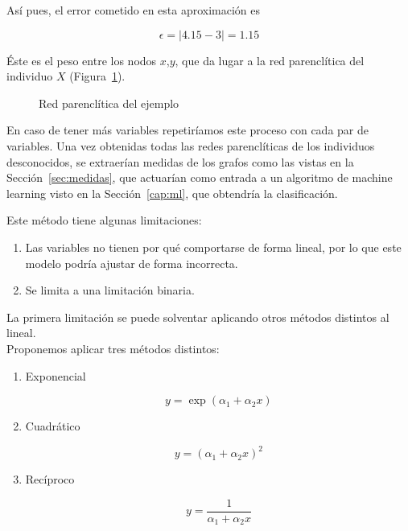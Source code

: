 \begin{ejemplo}
	Así pues, el error cometido en esta aproximación es
	
	\begin{equation*}
	\epsilon = |4.15 - 3| = 1.15
	\end{equation*}
	
	Éste es el peso entre los nodos $x$,$y$, que da lugar a la red parenclítica del individuo $X$ (Figura~\ref{fig:red_par}).\\
	
	\begin{figure}[htbp!]
		\centering
		\ejemploredparenclitica
		\caption{Red parenclítica del ejemplo}
		\label{fig:red_par}
	\end{figure}
	
	En caso de tener más variables repetiríamos este proceso con cada par de variables. Una vez obtenidas todas las redes parenclíticas de los individuos desconocidos, se extraerían medidas de los grafos como las vistas en la Sección~\ref{sec:medidas}, que actuarían como entrada a un algoritmo de machine learning visto en la Sección~\ref{cap:ml}, que obtendría la clasificación. 
\end{ejemplo}

Este método tiene algunas limitaciones:

\begin{enumerate}
	\item Las variables no tienen por qué comportarse de forma lineal, por lo que este modelo podría ajustar de forma incorrecta.
	\item Se limita a una limitación binaria. 
\end{enumerate}

La primera limitación se puede solventar aplicando otros métodos distintos al lineal.\\

Proponemos aplicar tres métodos distintos:

\begin{enumerate}
	\item Exponencial
	
	\begin{equation}
	y = \exp(\alpha_1 + \alpha_2 x)
	\end{equation}
	
	\item Cuadrático
	
	\begin{equation}
	y = (\alpha_1 + \alpha_2 x)^2
	\end{equation}
	
	\item Recíproco
	
	\begin{equation}
	y = \dfrac{1}{\alpha_1 + \alpha_2 x}
	\end{equation}
\end{enumerate}

